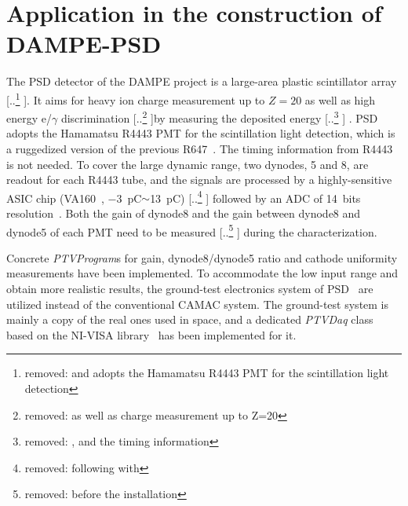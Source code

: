 \documentclass{nst}
\providecommand{\DIFadd}[1]{{\protect\color{blue} \sf #1}} %
\providecommand{\DIFdel}[1]{{\protect\color{red} [..\footnote{removed: #1} ]}} %
\providecommand{\DIFaddbegin}{} %
\providecommand{\DIFaddend}{} %
\providecommand{\DIFdelbegin}{} %
\providecommand{\DIFdelend}{} %
\begin{document}
\section{Application in the construction of DAMPE-PSD}
\label{sec:application}

The PSD detector of the DAMPE project is a large-area plastic scintillator array\DIFdelbegin \DIFdel{and adopts the Hamamatsu R4443 PMT for the scintillation light detection}\DIFdelend . It aims for \DIFaddbegin \DIFadd{heavy ion charge measurement up to $Z=20$ as well as }\DIFaddend high energy e/$\gamma$ discrimination \DIFdelbegin \DIFdel{as well as charge measurement up to Z=20 }\DIFdelend by measuring the deposited energy\DIFdelbegin \DIFdel{, and the timing information }\DIFdelend \DIFaddbegin \DIFadd{. PSD adopts the Hamamatsu R4443 PMT for the scintillation light detection, which is a ruggedized version of the previous R647~\cite{r4443}. The timing information from R4443 }\DIFaddend is not needed. To cover the large dynamic range, two dynodes, 5 and 8, are readout for each R4443 tube, 
and the signals are processed by a highly-sensitive ASIC chip (VA160~\cite{va160}, \SI{-3}{\pico\coulomb}$\sim$\SI{13}{\pico\coulomb}) \DIFdelbegin \DIFdel{following with }\DIFdelend \DIFaddbegin \DIFadd{followed by }\DIFaddend an ADC of 14~bits resolution~\cite{yanghaibo_fee}. 
Both the gain of dynode8 and the gain between dynode8 and dynode5 of each PMT need to be  measured \DIFdelbegin \DIFdel{before the installation}\DIFdelend \DIFaddbegin \DIFadd{during the characterization}\DIFaddend .

Concrete \textit{PTVProgram}s for gain, dynode8/dynode5 ratio and cathode uniformity measurements have been implemented.
To accommodate the low input range and obtain more realistic results, the ground-test electronics system of PSD~\cite{yanghaibo_fee} are utilized instead of the conventional CAMAC system. 
The ground-test system is mainly a copy of the real ones used in space, and a dedicated \textit{PTVDaq} class based on the NI-VISA library~\cite{ni_visa} has been implemented for it.

\end{document}
